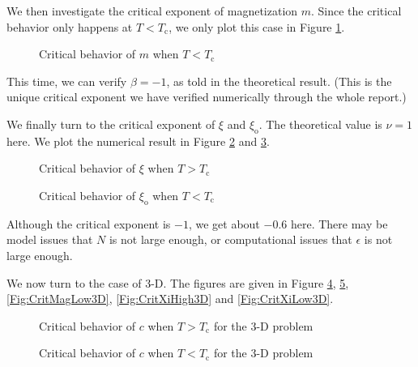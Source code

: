 \documentclass[english, nochinese]{pnote}
\begin{document}
We then investigate the critical exponent of magnetization $m$. Since the critical behavior only happens at $ T < T_{\text{c}} $, we only plot this case in Figure \ref{Fig:CritMagLow}.

\begin{figure}[htbp]
\centering
\scalebox{0.725}{}
\caption{Critical behavior of $m$ when $ T < T_{\text{c}}$}
\label{Fig:CritMagLow}
\end{figure}

This time, we can verify $ \beta = -1 $, as told in the theoretical result. (This is the unique critical exponent we have verified numerically through the whole report.)

We finally turn to the critical exponent of $\xi$ and $\xi_{\text{o}}$. The theoretical value is $ \nu = 1 $ here. We plot the numerical result in Figure \ref{Fig:CritXiHigh} and \ref{Fig:CritXiLow}.

\begin{figure}[htbp]
\centering

\caption{Critical behavior of $\xi$ when $ T > T_{\text{c}}$}
\label{Fig:CritXiHigh}
\end{figure}

\begin{figure}[htbp]
\centering

\caption{Critical behavior of $\xi_{\text{o}}$ when $ T < T_{\text{c}}$}
\label{Fig:CritXiLow}
\end{figure}

Although the critical exponent is $-1$, we get about $-0.6$ here. There may be model issues that $N$ is not large enough, or computational issues that $\epsilon$ is not large enough.

We now turn to the case of 3-D. The figures are given in Figure \ref{Fig:CritAlphaHigh3D}, \ref{Fig:CritAlphaLow3D}, \ref{Fig:CritMagLow3D}, \ref{Fig:CritXiHigh3D} and \ref{Fig:CritXiLow3D}.

\begin{figure}[htbp]
\centering
\scalebox{0.725}{}
\caption{Critical behavior of $c$ when $ T > T_{\text{c}}$ for the 3-D problem}
\label{Fig:CritAlphaHigh3D}
\end{figure}

\begin{figure}[htbp]
\centering
\scalebox{0.725}{}
\caption{Critical behavior of $c$ when $ T < T_{\text{c}}$ for the 3-D problem}
\label{Fig:CritAlphaLow3D}
\end{figure}
\end{document}
